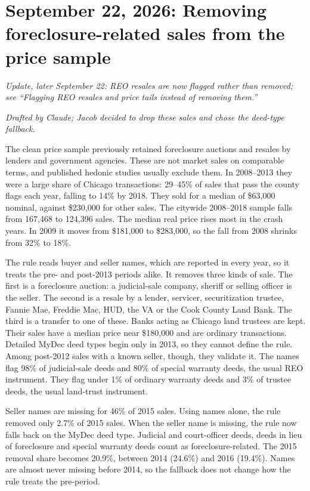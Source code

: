 \section*{September 22, 2026: Removing foreclosure-related sales from the price sample}
\textit{Update, later September 22: REO resales are now flagged rather than removed; see ``Flagging REO resales and price tails instead of removing them.''}

\textit{Drafted by Claude; Jacob decided to drop these sales and chose the deed-type fallback.}

The clean price sample previously retained foreclosure auctions and resales by
lenders and government agencies. These are not market sales on comparable
terms, and published hedonic studies usually exclude them. In 2008--2013 they
were a large share of Chicago transactions: 29--45\% of sales that pass the
county flags each year, falling to 14\% by 2018. They sold for a median of
\$63,000 nominal, against \$230,000 for other sales. The citywide 2008--2018
sample falls from 167,468 to 124,396 sales. The median real price rises most
in the crash years. In 2009 it moves from \$181,000 to \$283,000, so the fall
from 2008 shrinks from 32\% to 18\%.

The rule reads buyer and seller names, which are reported in every year, so it
treats the pre- and post-2013 periods alike. It removes three kinds of sale.
The first is a foreclosure auction: a judicial-sale company, sheriff or selling
officer is the seller. The second is a resale by a lender, servicer,
securitization trustee, Fannie Mae, Freddie Mac, HUD, the VA or the Cook County
Land Bank. The third is a transfer to one of these. Banks acting as Chicago
land trustees are kept. Their sales have a median price near \$180,000 and
are ordinary transactions. Detailed MyDec deed types begin only in 2013, so
they cannot define the rule. Among post-2012 sales with a known seller,
though, they validate it. The names flag 98\% of judicial-sale deeds and 80\%
of special warranty deeds, the usual REO instrument. They flag under 1\% of
ordinary warranty deeds and 3\% of trustee deeds, the usual land-trust
instrument.

Seller names are missing for 46\% of 2015 sales. Using names alone, the rule
removed only 2.7\% of 2015 sales. When the seller name is missing, the rule
now falls back on the MyDec deed type. Judicial and court-officer deeds, deeds
in lieu of foreclosure and special warranty deeds count as
foreclosure-related. The 2015 removal share becomes 20.9\%, between 2014
(24.6\%) and 2016 (19.4\%). Names are almost never missing before 2014, so the
fallback does not change how the rule treats the pre-period.

